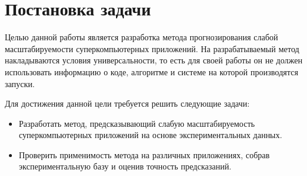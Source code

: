 \section{Постановка задачи}
	Целью данной работы является разработка метода прогнозирования слабой масштабируемости суперкомпьютерных приложений. На разрабатываемый метод накладываются условия универсальности, то есть для своей работы он не должен использовать информацию о коде, алгоритме и системе на которой производятся запуски.

	Для достижения данной цели требуется решить следующие задачи:
	\begin{itemize}
		\item Разработать метод, предсказывающий слабую масштабируемость суперкомпьютерных приложений на основе экспериментальных данных.
		\item Проверить применимость метода на различных приложениях, собрав экспериментальную базу и оценив точность предсказаний.
	\end{itemize}


\clearpage
